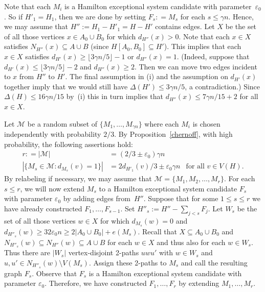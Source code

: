 \documentclass{memo-l}
\def\COMMENT#1{}
\def\eps{\varepsilon}
\def\epszero{\eps_0}
\numberwithin{section}{chapter}
\numberwithin{equation}{section}
\numberwithin{firstthm}{section}
\numberwithin{figure}{section}
\begin{document}
{Note that each $M_i$ is a Hamilton exceptional system candidate with parameter~$\eps_0$.
So if $H'_1 = H_1$, then we are done by setting $F_s: = M_s$ for each $s \le \gamma n$.
Hence, we may assume that $H'' := H_1 - H'_1=H-H'$ contains edges.
Let $X$ be the set of all those vertices $x \in A_0 \cup B_0$ for which $d_{H''}(x)> 0$.
Note that each $x\in X$ satisfies $N_{H''}(x)\subseteq A\cup B$ (since $H[A_0,B_0] \subseteq H'$).
This implies that
each $x \in X$ satisfies
$d_{H'}(x) \ge \lfloor  3\gamma n /5 \rfloor -1$ or $d_{H''}(x)=1$.
(Indeed, suppose that $d_{H'}(x) \le \lfloor  3\gamma n /5 \rfloor -2$ and $d_{H''}(x)\ge 2$.
Then we can move two edges incident to $x$ from $H''$ to $H'$.
The final assumption in (i) and the assumption on $d_{H'}(x)$ together imply that we would still have $\Delta(H') \le 3 \gamma n/5$, a contradiction.)
Since  $\Delta(H) \le 16 \gamma n /15$ by~(i) this in turn implies that
$d_{H''}(x) \le 7 \gamma n /15 +2$ for all $x \in X$.

Let $\mathcal{M}$ be a random subset of $\{M_1, \dots, M_{\gamma n}\}$ where each $M_i$ is chosen independently with probability $2/3$.
By Proposition~\ref{chernoff}, with high probability, the following assertions hold:
\begin{align}
	r : = |\mathcal{M}| & = (2/3 \pm \epszero){\gamma n} \nonumber \\
	|\{M_s \in \mathcal{M} : d_{M_s}(v) = 1 \}| & = 2 d_{H'_1}(v)/3  \pm \epszero{\gamma n}	& \text{for all } v \in V(H). \label{eqn:Mi}
\end{align}
By relabeling if necessary, we may assume that $\mathcal{M} = \{ M_1, M_2, \dots, M_r\}$.
For each $s \le r$, we will now extend $M_s$ to a Hamilton exceptional system candidate $F_s$ with parameter $\eps_0$ by adding edges from~$H''$.
Suppose that for some $1\le s\le r$ we have already constructed $F_1, \dots ,F_{s-1}$. Set $H''_s := H'' - \sum_{j < s} F_j$.
Let $W_s$ be the set of all those vertices $w \in X$ for which $d_{M_s}(w)=0$ and $d_{H''_s}(w) \ge 32\epszero n  \ge 2|A_0\cup B_0|+ e(M_s)$.
Recall that $X\subseteq A_0\cup B_0$ and $N_{H''_s}(w) \subseteq N_{H''}(w) \subseteq A \cup B$ for each $w\in X$ and thus also for
each $w \in W_s$. Thus there are $|W_s|$ vertex-disjoint 2-paths $uwu'$ with $w \in W_s$ and $u,u' \in N_{H''_s}(w) \setminus V(M_s)$.
Assign these 2-paths to $M_s$ and call the resulting graph $F_s$.
Observe that $F_s$ is a Hamilton exceptional system candidate with parameter $\eps_0$.
Therefore, we have constructed $F_1, \dots ,F_r$ by extending $M_1, \dots ,M_r$.

}
\end{document}

